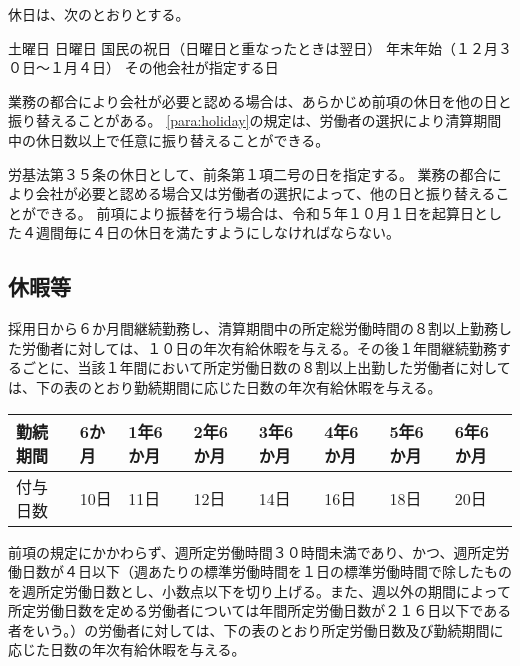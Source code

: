 \documentclass[10pt,a4paper,uplatex]{jsarticle}
\begin{document}
休日は、次のとおりとする。
\label{para:holiday}
\begin{enumerate}
    \itm 土曜日
    \itm 日曜日
    \itm 国民の祝日（日曜日と重なったときは翌日）
    \itm 年末年始（１２月３０日～１月４日）
    \itm その他会社が指定する日
\end{enumerate}
\term
業務の都合により会社が必要と認める場合は、あらかじめ前項の休日を他の日と振り替えることがある。
\term
\ref{para:holiday}の規定は、労働者の選択により清算期間中の休日数以上で任意に振り替えることができる。

\label{para:legal_holiday}
労基法第３５条の休日として、前条第１項二号の日を指定する。
\term 業務の都合により会社が必要と認める場合又は労働者の選択によって、他の日と振り替えることができる。
\term 前項により振替を行う場合は、令和５年１０月１日を起算日とした４週間毎に４日の休日を満たすようにしなければならない。

\subsection{休暇等}
採用日から６か月間継続勤務し、清算期間中の所定総労働時間の８割以上勤務した労働者に対しては、１０日の年次有給休暇を与える。その後１年間継続勤務するごとに、当該１年間において所定労働日数の８割以上出勤した労働者に対しては、下の表のとおり勤続期間に応じた日数の年次有給休暇を与える。

\hspace{2cm}\begin{tabular}{|l|p{2.5em}|p{2.5em}|p{2.5em}|p{2.5em}|p{2.5em}|p{2.5em}|p{2.5em}|} \hline
  勤続期間 & 6か月 & 1年6か月& 2年6か月& 3年6か月& 4年6か月& 5年6か月& 6年6か月 \\ \hline \hline
  付与日数 & 10日 & 11日& 12日& 14日& 16日& 18日& 20日 \\ \hline
\end{tabular}

\label{para:paid_vacation}
\term
前項の規定にかかわらず、週所定労働時間３０時間未満であり、かつ、週所定労働日数が４日以下（週あたりの標準労働時間を１日の標準労働時間で除したものを週所定労働日数とし、小数点以下を切り上げる。また、週以外の期間によって所定労働日数を定める労働者については年間所定労働日数が２１６日以下である者をいう。）の労働者に対しては、下の表のとおり所定労働日数及び勤続期間に応じた日数の年次有給休暇を与える。
\end{document}
